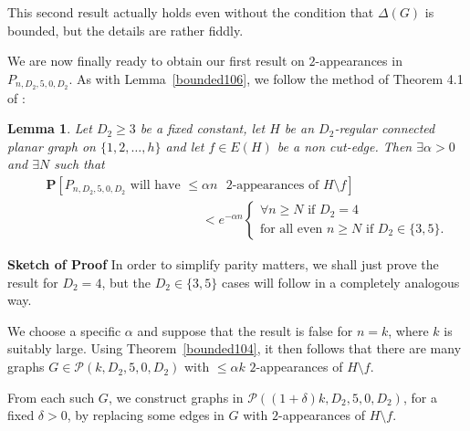 \documentclass{article}
\newtheorem{Lemma}[Theorem]{Lemma}
\newtheorem{Proof of Theorem}{Proof of Theorem}
\begin{document}
\phantom{p}

This second result actually holds even without the condition that $\Delta(G)$ is bounded,
but the details are rather fiddly. 















We are now finally ready to obtain our first result on $2$-appearances in $P_{n,D_{2},5,0,D_{2}}$.
As with Lemma~\ref{bounded106},
we follow the method of Theorem 4.1 of \cite{mcd}:














\begin{Lemma} \label{bounded109}
Let $D_{2} \geq 3$ be a fixed constant, 
let $H$ be an $D_{2}$-regular connected planar graph on $\{ 1,2, \ldots,h \}$
and let $f \in E(H)$ be a non cut-edge.
Then $\exists \alpha >0$ and $\exists N$ such that
\begin{eqnarray*}
& & \mathbf{P}[P_{n,D_{2},5,0,D_{2}} \textrm{ will have } \leq \alpha n \textrm{ $2$-appearances of } H \setminus f] \\
& & \phantom{wwwwwwwwwwwwwwwww} < e^{- \alpha n} 
\left \{ \begin{array}{ll}
\forall n \geq N \textrm{ if } D_{2}=4 \\
\textrm{for all even } n \geq N \textrm{ if } D_{2} \in \{ 3,5 \}.
\end{array} \right.
\end{eqnarray*}
\end{Lemma}
\textbf{Sketch of Proof} 
In order to simplify parity matters,
we shall just prove the result for $D_{2}=4$,
but the $D_{2} \in \{ 3,5 \}$ cases will follow in a completely analogous way.

We choose a specific $\alpha$
and suppose that the result is false for $n=k$,
where $k$ is suitably large.
Using Theorem~\ref{bounded104},
it then follows that there are many graphs $G \in \mathcal{P}(k,D_{2},5,0,D_{2})$ with $\leq \alpha k$
$2$-appearances of $H \setminus f$.

From each such $G$,
we construct graphs in $\mathcal{P}((1+\delta)k,D_{2},5,0,D_{2})$, for a fixed $\delta >0$,
by replacing some edges in $G$ with $2$-appearances of $H \setminus f$.
\end{document}

